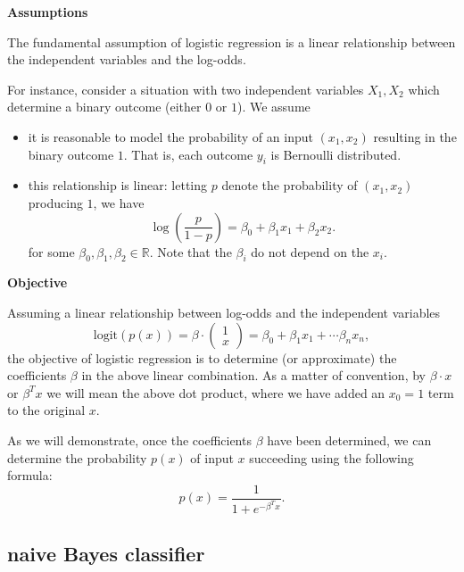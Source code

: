 \documentclass[12pt]{article}
\begin{document}
\textbf{Assumptions}

The fundamental assumption of logistic regression is a linear relationship between the independent variables and the log-odds. 

For instance, consider a situation with two independent variables $X_1,X_2$ which determine a binary outcome (either $0$ or $1$). We assume 
\begin{itemize}
	\item it is reasonable to model the probability of an input $(x_1,x_2)$ resulting in the binary outcome $1$. That is, each outcome $y_i$ is Bernoulli distributed. 
	\item this relationship is linear: letting $p$ denote the probability of $(x_1,x_2)$ producing $1$, we have 
		\begin{equation*}
			\log\left(\frac{p}{1-p}\right) = \beta_0 + \beta_1x_1 + \beta_2x_2.
		\end{equation*}
		for some $\beta_0,\beta_1,\beta_2\in\mathbb{R}$. Note that the $\beta_i$ do not depend on the $x_i$.
\end{itemize}

\textbf{Objective}

Assuming a linear relationship between log-odds and the independent variables 
\begin{equation*}
	\text{logit}(p(x)) = \beta \cdot \begin{pmatrix} 1 \\ x \end{pmatrix} = \beta_0 + \beta_1x_1 + \cdots \beta_nx_n,
\end{equation*}
the objective of logistic regression is to determine (or approximate) the coefficients $\beta$ in the above linear combination. As a matter of convention, by $\beta\cdot x$ or $\beta^Tx$ we will mean the above dot product, where we have added an $x_0=1$ term to the original $x$.

As we will demonstrate, once the coefficients $\beta$ have been determined, we can determine the probability $p(x)$ of input $x$ succeeding using the following formula:
\begin{equation*}
	p(x) = \frac{1}{1+e^{-\beta^Tx}}.
\end{equation*}


\subsection{naive Bayes classifier} %
\end{document}
